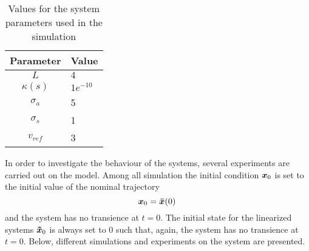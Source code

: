 \begin{table}[h]
	\centering
	\begin{tabular}{c|l}
	\hline
	\hline
	\textbf{Parameter} & \textbf{Value}\\
	\hline
	$L$ & $4$\\
	$\kappa (s)$ & $1e^{-10}$\\
	$\sigma_a$ & 5\\
	$\sigma_s$ & 1\\
	$v_{ref}$ & 3\\
	\hline
	\hline
	\end{tabular}
	\caption{Values for the system parameters used in the simulation}
	\label{tab:simu_param_values}
\end{table}
In order to investigate the behaviour of the systems, several experiments are carried out on the model.
Among all simulation the initial condition $\boldsymbol{x}_0$ is set to the initial value of the nominal trajectory 
\begin{equation}
	\boldsymbol{x}_0 = \boldsymbol{\bar{x}} (0) \, 
\end{equation}
and the system has no transience at $t = 0$. 
The initial state for the linearized systems $\boldsymbol{\tilde{x}}_0$ is always set to $0$ such that, again, the system has no transience at $t=0$.
Below, different simulations and experiments on the system are presented.

